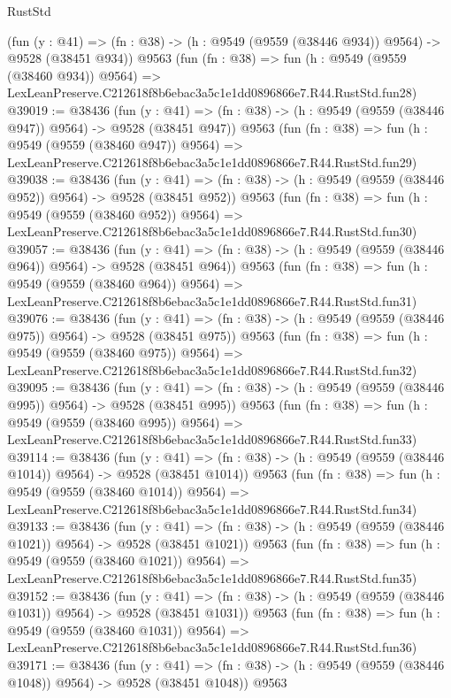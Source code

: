 \begin{lexlean}{RustStd}
\begin{coremodule}
    (fun (y : @41) => (fn : @38) -> (h : @9549 (@9559 (@38446 @934)) @9564) -> @9528 (@38451 @934))
    @9563
    (fun (fn : @38) =>
    fun (h : @9549 (@9559 (@38460 @934)) @9564) =>
    LexLeanPreserve.C212618f8b6ebac3a5c1e1dd0896866e7.R44.RustStd.fun28)
@39019 := @38436
    (fun (y : @41) => (fn : @38) -> (h : @9549 (@9559 (@38446 @947)) @9564) -> @9528 (@38451 @947))
    @9563
    (fun (fn : @38) =>
    fun (h : @9549 (@9559 (@38460 @947)) @9564) =>
    LexLeanPreserve.C212618f8b6ebac3a5c1e1dd0896866e7.R44.RustStd.fun29)
@39038 := @38436
    (fun (y : @41) => (fn : @38) -> (h : @9549 (@9559 (@38446 @952)) @9564) -> @9528 (@38451 @952))
    @9563
    (fun (fn : @38) =>
    fun (h : @9549 (@9559 (@38460 @952)) @9564) =>
    LexLeanPreserve.C212618f8b6ebac3a5c1e1dd0896866e7.R44.RustStd.fun30)
@39057 := @38436
    (fun (y : @41) => (fn : @38) -> (h : @9549 (@9559 (@38446 @964)) @9564) -> @9528 (@38451 @964))
    @9563
    (fun (fn : @38) =>
    fun (h : @9549 (@9559 (@38460 @964)) @9564) =>
    LexLeanPreserve.C212618f8b6ebac3a5c1e1dd0896866e7.R44.RustStd.fun31)
@39076 := @38436
    (fun (y : @41) => (fn : @38) -> (h : @9549 (@9559 (@38446 @975)) @9564) -> @9528 (@38451 @975))
    @9563
    (fun (fn : @38) =>
    fun (h : @9549 (@9559 (@38460 @975)) @9564) =>
    LexLeanPreserve.C212618f8b6ebac3a5c1e1dd0896866e7.R44.RustStd.fun32)
@39095 := @38436
    (fun (y : @41) => (fn : @38) -> (h : @9549 (@9559 (@38446 @995)) @9564) -> @9528 (@38451 @995))
    @9563
    (fun (fn : @38) =>
    fun (h : @9549 (@9559 (@38460 @995)) @9564) =>
    LexLeanPreserve.C212618f8b6ebac3a5c1e1dd0896866e7.R44.RustStd.fun33)
@39114 := @38436
    (fun (y : @41) =>
    (fn : @38) -> (h : @9549 (@9559 (@38446 @1014)) @9564) -> @9528 (@38451 @1014))
    @9563
    (fun (fn : @38) =>
    fun (h : @9549 (@9559 (@38460 @1014)) @9564) =>
    LexLeanPreserve.C212618f8b6ebac3a5c1e1dd0896866e7.R44.RustStd.fun34)
@39133 := @38436
    (fun (y : @41) =>
    (fn : @38) -> (h : @9549 (@9559 (@38446 @1021)) @9564) -> @9528 (@38451 @1021))
    @9563
    (fun (fn : @38) =>
    fun (h : @9549 (@9559 (@38460 @1021)) @9564) =>
    LexLeanPreserve.C212618f8b6ebac3a5c1e1dd0896866e7.R44.RustStd.fun35)
@39152 := @38436
    (fun (y : @41) =>
    (fn : @38) -> (h : @9549 (@9559 (@38446 @1031)) @9564) -> @9528 (@38451 @1031))
    @9563
    (fun (fn : @38) =>
    fun (h : @9549 (@9559 (@38460 @1031)) @9564) =>
    LexLeanPreserve.C212618f8b6ebac3a5c1e1dd0896866e7.R44.RustStd.fun36)
@39171 := @38436
    (fun (y : @41) =>
    (fn : @38) -> (h : @9549 (@9559 (@38446 @1048)) @9564) -> @9528 (@38451 @1048))
    @9563

\end{coremodule}
\end{lexlean}
